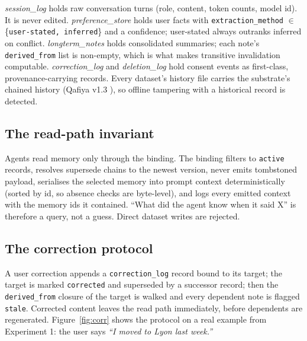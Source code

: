 \documentclass[11pt]{article}
\begin{document}
\emph{session\_log} holds raw conversation turns (role, content, token counts, model id). It is never edited. \emph{preference\_store} holds user facts with \texttt{extraction\_method} $\in$ \{\texttt{user-stated, inferred}\} and a confidence; user-stated always outranks inferred on conflict. \emph{longterm\_notes} holds consolidated summaries; each note's \texttt{derived\_from} list is non-empty, which is what makes transitive invalidation computable. \emph{correction\_log} and \emph{deletion\_log} hold consent events as first-class, provenance-carrying records. Every dataset's history file carries the substrate's chained history (Qafiya v1.3 \cite{qafiya}), so offline tampering with a historical record is detected.

\subsection{The read-path invariant}
Agents read memory only through the binding. The binding filters to \texttt{active} records, resolves supersede chains to the newest version, never emits tombstoned payload, serialises the selected memory into prompt context deterministically (sorted by id, so absence checks are byte-level), and logs every emitted context with the memory ids it contained. ``What did the agent know when it said X'' is therefore a query, not a guess. Direct dataset writes are rejected.

\subsection{The correction protocol}
A user correction appends a \texttt{correction\_log} record bound to its target; the target is marked \texttt{corrected} and superseded by a successor record; then the \texttt{derived\_from} closure of the target is walked and every dependent note is flagged \texttt{stale}. Corrected content leaves the read path immediately, before dependents are regenerated. Figure~\ref{fig:corr} shows the protocol on a real example from Experiment 1: the user says \emph{``I moved to Lyon last week.''}
\end{document}
